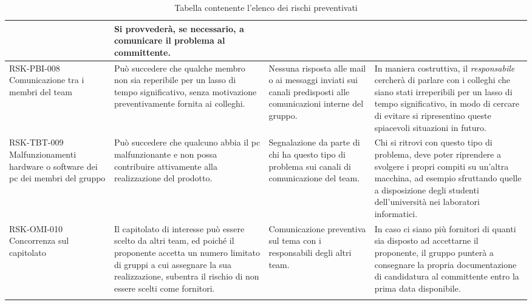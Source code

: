 \begin{center}
\begin{longtable}{|p{3cm}|p{4cm}|p{3.5cm}|p{3.5cm}|}
	& Si provvederà, se necessario, a comunicare il problema al committente.  \\
	\hline
	
		\hline
	RSK-PBI-008 \newline Comunicazione tra i membri del team
	 & 
	Può succedere che qualche membro non sia reperibile per un lasso di tempo significativo, senza motivazione preventivamente fornita ai colleghi.
	&   

	Nessuna risposta alle mail o ai messaggi inviati sui canali predisposti alle comunicazioni interne del gruppo.
	 
	& In maniera costruttiva, il \textit{responsabile}
	   cercherà di parlare con i colleghi che siano stati irreperibili per un lasso di tempo significativo, in modo di cercare di evitare si ripresentino queste spiacevoli situazioni in futuro. \\
	\hline
	
			\hline
	RSK-TBT-009 \newline Malfunzionamenti hardware o software dei pc dei membri del gruppo
	 & 
	Può succedere che qualcuno abbia il pc malfunzionante e non possa contribuire attivamente alla realizzazione del prodotto.
	&   

	Segnalazione da parte di chi ha questo tipo di problema sui canali di comunicazione del team.
	 
	& Chi si ritrovi con questo tipo di problema, deve poter riprendere a svolgere i propri compiti su un'altra macchina, ad esempio sfruttando quelle a disposizione degli studenti dell'università nei laboratori informatici. \\
	\hline
	
	
				\hline
	RSK-OMI-010 \newline Concorrenza sul capitolato
	 & 
	Il capitolato di interesse può essere scelto da altri team, ed poiché il proponente accetta un numero limitato di gruppi a cui assegnare la sua realizzazione, subentra il rischio di non essere scelti come fornitori.
	&   

	Comunicazione preventiva sul tema con i responsabili degli altri team.
	 
	& In caso ci siano più fornitori di quanti sia disposto ad accettarne il proponente, il gruppo punterà a consegnare la propria documentazione di candidatura al committente entro la prima data disponibile. \\
	\hline
	
		\caption{Tabella contenente l'elenco dei rischi preventivati}
	\end{longtable}

\end{center}
